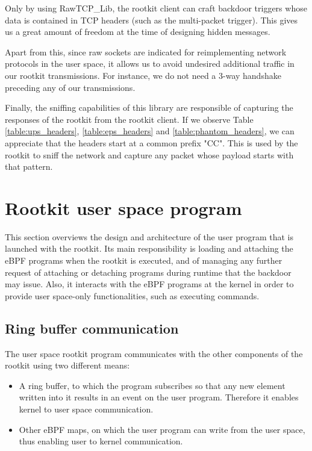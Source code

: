 Only by using RawTCP\_Lib, the rootkit client can craft backdoor triggers whose data is contained in TCP headers (such as the multi-packet trigger). This gives us a great amount of freedom at the time of designing hidden messages. 

Apart from this, since raw sockets are indicated for reimplementing network protocols in the user space, it allows us to avoid undesired additional traffic in our rootkit transmissions. For instance, we do not need a 3-way handshake preceding any of our transmissions.

Finally, the sniffing capabilities of this library are responsible of capturing the responses of the rootkit from the rootkit client. If we observe Table \ref{table:ups_headers}, \ref{table:eps_headers} and \ref{table:phantom_headers}, we can appreciate that the headers start at a common prefix "CC". This is used by the rootkit to sniff the network and capture any packet whose payload starts with that pattern.



\section{Rootkit user space program}
This section overviews the design and architecture of the user program that is launched with the rootkit. Its main responsibility is loading and attaching the eBPF programs when the rootkit is executed, and of managing any further request of attaching or detaching programs during runtime that the backdoor may issue. Also, it interacts with the eBPF programs at the kernel in order to provide user space-only functionalities, such as executing commands. 

\subsection{Ring buffer communication}
The user space rootkit program communicates with the other components of the rootkit using two different means:
\begin{itemize}
\item A ring buffer, to which the program subscribes so that any new element written into it results in an event on the user program. Therefore it enables kernel to user space communication.
\item Other eBPF maps, on which the user program can write from the user space, thus enabling user to kernel communication.
\end{itemize}


